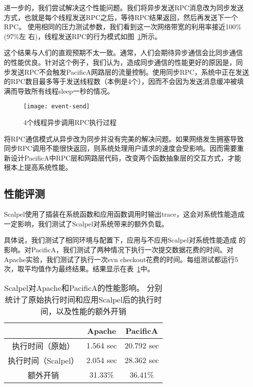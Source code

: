 进一步的，我们尝试解决这个性能问题。我们将异步发送RPC消息改为同步发送
方式，也就是每个线程发送RPC之后，等待RPC结果返回，然后再发送下一个RPC。
使用相同的压力测试参数，我们看到这一次网络带宽的利用率接近100\%(97\%左
右)，线程发送RPC的行为模式如图~\ref{fig:event-send}所示。

这个结果与人们的直观预期不太一致。通常，人们会期待异步通信会比同步通信
的性能优良。针对这个例子，我们认为，造成同步通信的性能更好的原因是，同
步发送RPC不会触发PacificA网路层的流量控制。使用同步RPC，系统中正在发送
的RPC数目最多等于发送线程数（本例是4个），因而不会因为发送消息缓冲被填
满而导致所有线程sleep一秒的情况。

\begin{figure}
  \centering
  \begin{minipage}{0.8\linewidth}
    \centering
    \texttt{[image: event-send]}
    \caption{4个线程异步调用RPC执行过程}
    \label{fig:event-send}
  \end{minipage}
\end{figure}

将RPC通信模式从异步改为同步并没有完美的解决问题。如果网络发生拥塞导致
同步RPC调用不能很快返回，则系统处理用户请求的速度会受影响。因而需要重
新设计PacificA中RPC层和网路层代码，改变两个函数抽象层的交互方式，才能
根本上提高系统性能。


\subsection{性能评测}
\label{sec:scp:perf}

Scalpel使用了插装在系统函数和应用函数调用时输出trace，这会对系统性能造成
一定影响，我们测试了Scalpel对系统带来的额外负载。

具体说，我们测试了相同环境与配置下，应用与不应用Scalpel对系统性能造成
的影响。对PacificA，我们测试了两种情况下执行一次提交数据花费的时间。对
Apache实验，我们测试了执行一次svn checkout花费的时间。每组测试都运行5
次，取平均值作为最终结果。结果显示在表~\ref{fig:perf}中。

\begin{table}[t!]
\small
\centering
\begin{minipage}{0.8\linewidth}
\centering
\caption{Scalpel对Apache和PacificA的性能影响。
分别统计了原始执行时间和应用Scalpel后的执行时间，以及性能的额外开销}
\label{fig:perf}
\begin{tabular}{ccc}

\toprule[1.5pt]
  		& Apache	& PacificA \\
\midrule[1pt]
执行时间（原始）& 1.564 sec	& 20.792 sec \\
执行时间（Scalpel）& 2.054 sec	& 28.362 sec \\
额外开销	& 31.33\%       & 36.41\% \\
\bottomrule[1.5pt]
\end{tabular}
\end{minipage}
\end{table}

